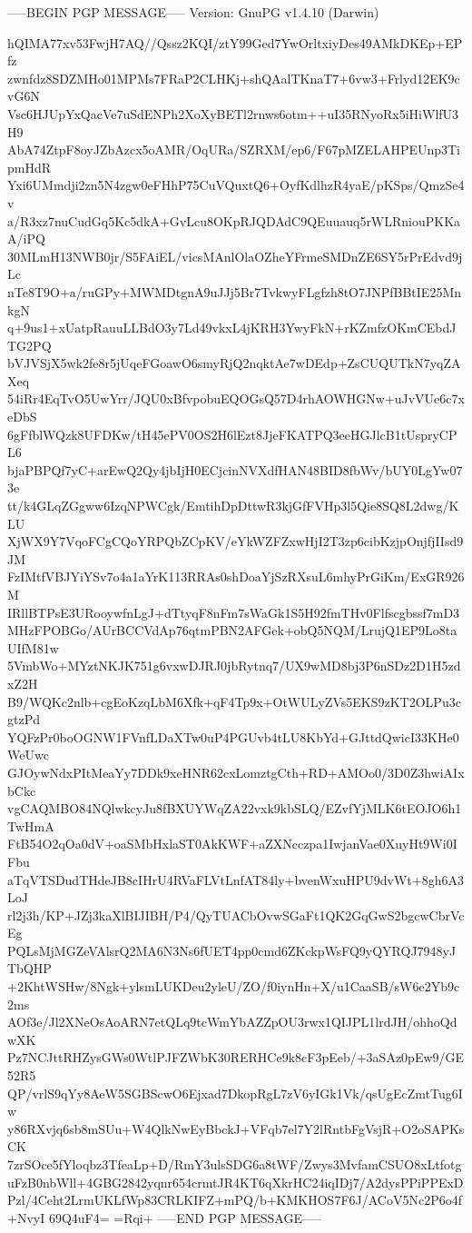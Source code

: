 -----BEGIN PGP MESSAGE-----
Version: GnuPG v1.4.10 (Darwin)

hQIMA77xv53FwjH7AQ//Qssz2KQI/ztY99Ged7YwOrltxiyDes49AMkDKEp+EPfz
zwnfdz8SDZMHo01MPMs7FRaP2CLHKj+shQAalTKnaT7+6vw3+Frlyd12EK9cvG6N
Vsc6HJUpYxQacVe7uSdENPh2XoXyBETl2rnws6otm++uI35RNyoRx5iHiWlfU3H9
AbA74ZtpF8oyJZbAzcx5oAMR/OqURa/SZRXM/ep6/F67pMZELAHPEUnp3TipmHdR
Yxi6UMmdji2zn5N4zgw0eFHhP75CuVQuxtQ6+OyfKdlhzR4yaE/pKSps/QmzSe4v
a/R3xz7nuCudGq5Kc5dkA+GvLcu8OKpRJQDAdC9QEuuauq5rWLRniouPKKaA/iPQ
30MLmH13NWB0jr/S5FAiEL/vicsMAnlOlaOZheYFrmeSMDnZE6SY5rPrEdvd9jLc
nTe8T9O+a/ruGPy+MWMDtgnA9uJJj5Br7TvkwyFLgfzh8tO7JNPfBBtIE25MnkgN
q+9us1+xUatpRauuLLBdO3y7Ld49vkxL4jKRH3YwyFkN+rKZmfzOKmCEbdJTG2PQ
bVJVSjX5wk2fe8r5jUqeFGoawO6smyRjQ2nqktAe7wDEdp+ZsCUQUTkN7yqZAXeq
54iRr4EqTvO5UwYrr/JQU0xBfvpobuEQOGsQ57D4rhAOWHGNw+uJvVUe6c7xeDbS
6gFfblWQzk8UFDKw/tH45ePV0OS2H6lEzt8JjeFKATPQ3eeHGJlcB1tUspryCPL6
bjaPBPQf7yC+arEwQ2Qy4jbIjH0ECjcinNVXdfHAN48BID8fbWv/bUY0LgYw073e
tt/k4GLqZGgww6IzqNPWCgk/EmtihDpDttwR3kjGfFVHp3l5Qie8SQ8L2dwg/KLU
XjWX9Y7VqoFCgCQoYRPQbZCpKV/eYkWZFZxwHjI2T3zp6cibKzjpOnjfjIIsd9JM
FzIMtfVBJYiYSv7o4a1aYrK113RRAs0shDoaYjSzRXsuL6mhyPrGiKm/ExGR926M
IRllBTPsE3URooywfnLgJ+dTtyqF8nFm7sWaGk1S5H92fmTHv0Flfscgbssf7mD3
MHzFPOBGo/AUrBCCVdAp76qtmPBN2AFGek+obQ5NQM/LrujQ1EP9Lo8taUIfM81w
5VmbWo+MYztNKJK751g6vxwDJRJ0jbRytnq7/UX9wMD8bj3P6nSDz2D1H5zdxZ2H
B9/WQKc2nlb+cgEoKzqLbM6Xfk+qF4Tp9x+OtWULyZVs5EKS9zKT2OLPu3cgtzPd
YQFzPr0boOGNW1FVnfLDaXTw0uP4PGUvb4tLU8KbYd+GJttdQwicI33KHe0WeUwc
GJOywNdxPItMeaYy7DDk9xeHNR62cxLomztgCth+RD+AMOo0/3D0Z3hwiAIxbCkc
vgCAQMBO84NQlwkcyJu8fBXUYWqZA22vxk9kbSLQ/EZvfYjMLK6tEOJO6h1TwHmA
FtB54O2qOa0dV+oaSMbHxlaST0AkKWF+aZXNcczpa1IwjanVae0XuyHt9Wi0IFbu
aTqVTSDudTHdeJB8cIHrU4RVaFLVtLnfAT84ly+bvenWxuHPU9dvWt+8gh6A3LoJ
rl2j3h/KP+JZj3kaXlBIJIBH/P4/QyTUACbOvwSGaFt1QK2GqGwS2bgcwCbrVcEg
PQLsMjMGZeVAlsrQ2MA6N3Ns6fUET4pp0cmd6ZKckpWsFQ9yQYRQJ7948yJTbQHP
+2KhtWSHw/8Ngk+ylsmLUKDeu2yleU/ZO/f0iynHn+X/u1CaaSB/sW6e2Yb9c2ms
AOf3e/Jl2XNeOsAoARN7etQLq9tcWmYbAZZpOU3rwx1QIJPL1lrdJH/ohhoQdwXK
Pz7NCJttRHZysGWs0WtlPJFZWbK30RERHCe9k8cF3pEeb/+3aSAz0pEw9/GE52R5
QP/vrlS9qYy8AeW5SGBScwO6Ejxad7DkopRgL7zV6yIGk1Vk/qsUgEcZmtTug6Iw
y86RXvjq6sb8mSUu+W4QlkNwEyBbckJ+VFqb7el7Y2lRntbFgVsjR+O2oSAPKsCK
7zrSOce5fYloqbz3TfeaLp+D/RmY3ulsSDG6a8tWF/Zwys3MvfamCSUO8xLtfotg
uFzB0nbWll+4GBG2842yqnr654crmtJR4KT6qXkrHC24iqIDj7/A2dysPPiPPExD
Pzl/4Ceht2LrmUKLfWp83CRLKIFZ+mPQ/b+KMKHOS7F6J/ACoV5Nc2P6o4f+NvyI
69Q4uF4=
=Rqi+
-----END PGP MESSAGE-----
